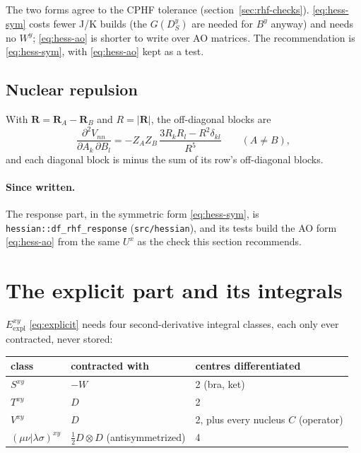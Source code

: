 \documentclass[11pt]{article}
\newcommand{\code}[1]{\texttt{#1}}
\newcommand{\Exy}{E^{xy}}
\newcommand{\Dsk}[1]{D_S^{#1}}
\begin{document}
The two forms agree to the CPHF tolerance (section~\ref{sec:rhf-checks}).
\eqref{eq:hess-sym} costs fewer J/K builds (the $G(\Dsk{y})$ are needed
for $B^y$ anyway) and needs no $W^y$; \eqref{eq:hess-ao} is shorter to
write over AO matrices. The recommendation is \eqref{eq:hess-sym}, with
\eqref{eq:hess-ao} kept as a test.

\subsection{Nuclear repulsion}

With $\mathbf R = \mathbf R_A - \mathbf R_B$ and $R = |\mathbf R|$, the
off-diagonal blocks are
\begin{equation}
  \frac{\partial^2 V_{nn}}{\partial A_k\,\partial B_l}
  = -Z_A Z_B\,\frac{3R_kR_l - R^2\delta_{kl}}{R^5}
  \qquad (A \neq B),
\end{equation}
and each diagonal block is minus the sum of its row's off-diagonal blocks.

\paragraph{Since written.} The response part, in the symmetric form
\eqref{eq:hess-sym}, is \code{hessian::df\_rhf\_response}
(\code{src/hessian}), and its tests build the AO form \eqref{eq:hess-ao}
from the same $U^x$ as the check this section recommends.

\section{The explicit part and its integrals}
\label{sec:integrals}

$\Exy_{\mathrm{expl}}$ \eqref{eq:explicit} needs four second-derivative
integral classes, each only ever contracted, never stored:

\begin{center}
\begin{tabular}{@{}lll@{}}
\toprule
class & contracted with & centres differentiated \\
\midrule
$S^{xy}$ & $-W$ & 2 (bra, ket) \\
$T^{xy}$ & $D$ & 2 \\
$V^{xy}$ & $D$ & 2, plus every nucleus $C$ (operator) \\
$(\mu\nu|\lambda\sigma)^{xy}$ & $\frac12 D\otimes D$ (antisymmetrized) & 4 \\
\bottomrule
\end{tabular}
\end{center}
\end{document}
